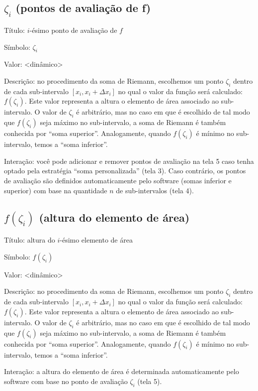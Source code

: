 \documentclass[a4paper,10pt]{scrartcl}
\begin{document}
  \subsection*{$\zeta_i$ (pontos de avaliação de f)}
    \begin{compactdesc}
      \item{Título:} $i$-ésimo ponto de avaliação de $f$
      \item{Símbolo:} $\zeta_i$
      \item{Valor:} <dinâmico>
      \item{Descrição:} no procedimento da soma de Riemann, escolhemos um ponto $\zeta_i$ dentro de cada sub-intervalo $[x_i,x_i + \Delta x_i]$ no qual o valor da função será calculado: $f(\zeta_i)$. Este valor representa a altura o elemento de área associado ao sub-intervalo. O valor de $\zeta_i$ é arbitrário, mas no caso em que é escolhido de tal modo que $f(\zeta_i)$ seja máximo no sub-intervalo, a soma de Riemann é também conhecida por ``soma superior''. Analogamente, quando $f(\zeta_i)$ é mínimo no sub-intervalo, temos a ``soma inferior''.
      \item{Interação:} você pode adicionar e remover pontos de avaliação na tela 5 caso tenha optado pela estratégia ``soma personalizada'' (tela 3). Caso contrário, os pontos de avaliação são definidos automaticamente pelo software (somas inferior e superior) com base na quantidade $n$ de sub-intervalos (tela 4).
    \end{compactdesc}
	
  \subsection*{$f(\zeta_i)$ (altura do elemento de área)}
    \begin{compactdesc}
      \item{Título:} altura do $i$-ésimo elemento de área
      \item{Símbolo:} $f(\zeta_i)$
      \item{Valor:} <dinâmico>
      \item{Descrição:} no procedimento da soma de Riemann, escolhemos um ponto $\zeta_i$ dentro de cada sub-intervalo $[x_i,x_i + \Delta x_i]$ no qual o valor da função será calculado: $f(\zeta_i)$. Este valor representa a altura o elemento de área associado ao sub-intervalo. O valor de $\zeta_i$ é arbitrário, mas no caso em que é escolhido de tal modo que $f(\zeta_i)$ seja máximo no sub-intervalo, a soma de Riemann é também conhecida por ``soma superior''. Analogamente, quando $f(\zeta_i)$ é mínimo no sub-intervalo, temos a ``soma inferior''.
      \item{Interação:} a altura do elemento de área é determinada automaticamente pelo software com base no ponto de avaliação $\zeta_i$ (tela 5).
    \end{compactdesc}
\end{document}
